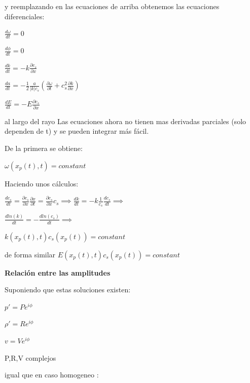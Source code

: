 \documentclass{article}
\begin{document}
y reemplazando en las ecuaciones de arriba obtenemos  las ecuaciones diferenciales:
\begin{description}  
\item $\frac{d\omega}{dt} = 0$
\item $\frac{d\phi}{dt} = 0$
\item $\frac{dk}{dt} = -k \frac{\partial c_s}{\partial x} $
\item $\frac{da}{dt} = -\frac{1}{2} \frac{a}{|k| c_s} (\frac{\partial \omega}{\partial t} + c_s^{2}  \frac{\partial k}{\partial x}) $
\item$\frac{dE}{dt} = -E \frac{\partial  c_s}{\partial x} $

\end{description}
al largo del rayo
Las ecuaciones ahora no tienen mas derivadas parciales (solo dependen de t) y se pueden integrar más fácil.
\begin{description}
\item De la primera se obtiene:  
\item $ \omega(x_p(t), t)  = constant $
\end{description}
Haciendo unos cálculos:
\begin{description}  
\item $\frac{dc_s}{dt} =  \frac{\partial c_s}{\partial x} \frac{\partial x}{\partial t} = \frac{\partial c_s}{\partial x}  c_s\implies
\frac{dk}{dt} = -k  \frac{1}{c_s} \frac{dc_s}{dt} \implies$
\item $\frac{dln(k)}{dt} = - \frac{dln(c_s)}{dt} \implies $
\item $ k(x_p(t), t)  c_s(x_p(t)) = constant $
\item de forma similar $ E(x_p(t), t)  c_s(x_p(t)) = constant $ 
\end{description}

\textbf{Relación entre las amplitudes}

\begin{description}  
\item Suponiendo que estas soluciones existen:
\item $p\prime = P e^{i\phi}$
\item $\rho\prime = R e^{i\phi}$
\item $v = V e^{i\phi}$
\item P,R,V  complejos
\end{description}

igual que en caso homogeneo :
\end{document}
